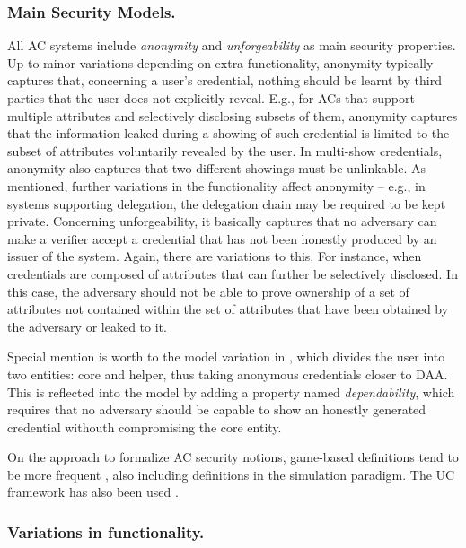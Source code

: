 \subsubsection{Main Security Models.}
%
All AC systems include \emph{anonymity} and \emph{unforgeability} as main
security properties. Up to minor variations depending on extra functionality,
anonymity typically captures that, concerning a user's credential, nothing
should be learnt by third parties that the user does not explicitly reveal.
E.g., for ACs that support multiple attributes and selectively disclosing
subsets of them, anonymity captures that the information leaked during a showing
of such credential is limited to the subset of attributes voluntarily revealed
by the user. In multi-show credentials, anonymity also captures that two
different showings must be unlinkable.
As mentioned, further variations in the functionality affect anonymity --
e.g., in systems supporting delegation, the delegation chain may be required
to be kept private.
% 
Concerning unforgeability, it basically captures that no adversary can make
a verifier accept a credential that has not been honestly produced by an
issuer of the system. Again, there are variations to this. For instance, when
credentials are composed of attributes that can further be selectively
disclosed. In this case, the adversary should not be able to prove ownership
of a set of attributes not contained within the set of attributes that have
been obtained by the adversary or leaked to it.

Special mention is worth to the model variation in \cite{hs21}, which divides
the user into two entities: core and helper, thus taking anonymous credentials
closer to DAA. This is reflected into the model by adding a property named
\emph{dependability}, which requires that no adversary should be capable to
show an honestly generated credential withouth compromising the core entity.

On the approach to formalize AC security notions, game-based definitions tend to
be more frequent \cite{bcc+09,cks10,cl11,cklm14,cmz14,ckl+15,dmm+18,fhs19,hs21},
also including definitions in the simulation paradigm. The UC framework
has also been used \cite{cdhk15}.

\subsubsection{Variations in functionality.}
%
